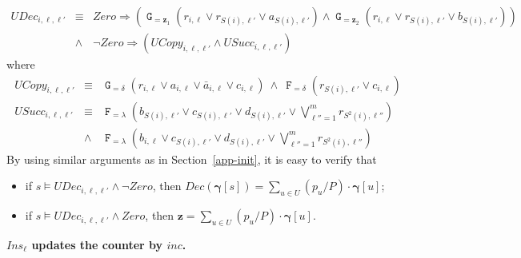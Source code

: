 \documentclass[a4paper,UKenglish,cleveref, autoref, thm-restate]{lipics-v2021}
\newcommand{\Zero}{\mathit{Zero}}
\newcommand{\Ins}{\mathit{Ins}}
\newcommand{\USucc}{\mathit{USucc}}
\newcommand{\DEC}{\mathit{Dec}}
\renewcommand{\vec}[1]{\pmb{#1}}
\newcommand{\UCopy}{\textit{UCopy}}
\newcommand{\UDec}{\textit{UDec}}
\newcommand{\Inc}{\textit{inc}}
\newcommand{\cv}{\vec{\gamma}}
\newcommand*{\opf}{\operatorname{\pmb{\mathtt{F}}}}
\newcommand*{\opg}{\operatorname{\pmb{\mathtt{G}}}}
\renewcommand{\paragraph}[1]{\medskip

\noindent\textbf{#1.}\quad }
\begin{document}
\begin{eqnarray}
    \UDec_{i,\ell,\ell'} & \equiv &  \Zero 
    \Rightarrow \left(\opg_{=\vec{z}_1}(r_{i,\ell} \vee r_{S(i),\ell'} \vee a_{S(i),\ell'})  \wedge  
        \opg_{=\vec{z}_2}(r_{i,\ell} \vee r_{S(i),\ell'} \vee b_{S(i),\ell'})\right)\\
     & \wedge &  \neg\Zero 
        \Rightarrow \left( \UCopy_{i,\ell,\ell'} \wedge \USucc_{i,\ell,\ell'} \right)               
\end{eqnarray}
where
\begin{eqnarray*}
\UCopy_{i,\ell,\ell'} & \equiv &
   \opg_{=\delta}(r_{i,\ell} \vee a_{i,\ell} \vee \bar{a}_{i,\ell} \vee c_{i,\ell}) 
    \ \wedge \ \opf_{=\delta}(r_{S(i),\ell'} \vee c_{i,\ell})\\[1ex]
\USucc_{i,\ell,\ell'} & \equiv & \textstyle\opf_{=\lambda}(b_{S(i),\ell'} \vee c_{S(i),\ell'} \vee d_{S(i),\ell'} \vee \bigvee_{\ell'' = 1}^m r_{S^2(i),\ell''})\\
 & \wedge & \textstyle\opf_{=\lambda}(b_{i,\ell} \vee c_{S(i),\ell'} \vee d_{S(i),\ell'} \vee \bigvee_{\ell'' = 1}^m r_{S^2(i),\ell''})             
\end{eqnarray*}By using similar arguments as in Section~\ref{app-init}, it is easy to verify that 
\begin{itemize}
    \item if $s \models \UDec_{i,\ell,\ell'} \wedge \neg\Zero$, then $\DEC(\cv[s]) =  \sum_{u \in U} (p_u/P) \cdot \cv[u]$;
    \item if $s \models \UDec_{i,\ell,\ell'} \wedge \Zero$, then $\vec{z} =  \sum_{u \in U} (p_u/P) \cdot \cv[u]$.
\end{itemize}



\paragraph{$\pmb{\Ins_\ell}$ updates the counter by $\Inc$}
\end{document}
